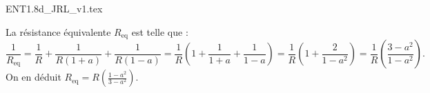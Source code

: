 

\begin{enonce}
{ENT1.8d_JRL_v1.tex}
\end{enonce}


\begin{corrigeNewpage}
	La résistance équivalente $R_\text{eq}$ est telle que : 
	\[
	\frac{1}{R_\text{eq}}=\frac{1}{R}+\frac{1}{R(1+a)}+\frac{1}{R(1-a)}=
	\frac{1}{R}\left(1+\frac{1}{1+a}+\frac{1}{1-a}\right)=
	\frac{1}{R}\left(1+\frac{2}{1-a^2}\right)=
	\frac{1}{R}\left(\frac{3-a^2}{1-a^2}\right).
	\]
	On en déduit $R_\text{eq}=R\left(\frac{1-a^2}{3-a^2}\right)$.
\end{corrigeNewpage}

%
%
%
%

\finEntrainement


\newpage

\hauteurLargeurCadreReponse		{7mm}{15mm}
\initialisationEntrainement


